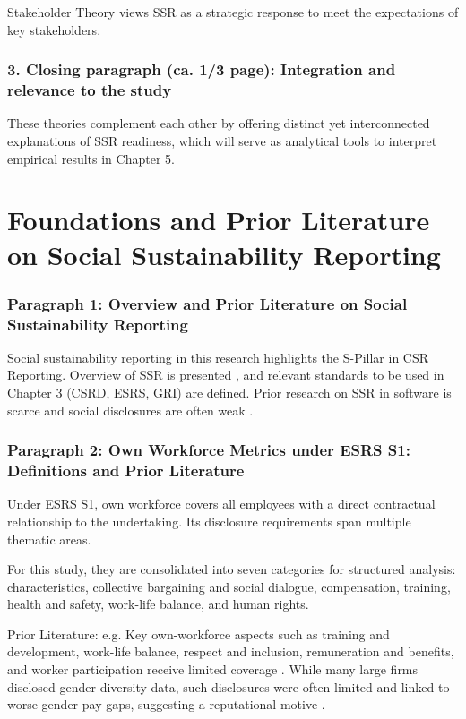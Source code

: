 Stakeholder Theory \parencite{Freeman1984} views SSR as a strategic response to meet the expectations of key stakeholders.

\subsubsection{3. Closing paragraph (ca. 1/3 page): Integration and relevance to the study}

These theories complement each other by offering distinct yet interconnected explanations of SSR readiness, 
which will serve as analytical tools to interpret empirical results in Chapter 5.

\section{Foundations and Prior Literature on Social Sustainability Reporting}

\subsubsection{Paragraph 1: Overview and Prior Literature on Social Sustainability Reporting}
Social sustainability reporting in this research highlights the S-Pillar in CSR Reporting.
Overview of SSR is presented \parencite{Edge2022,Fiechter2022}, and relevant standards \parencite{Dechow2023} to be 
used in Chapter 3 (CSRD, ESRS, GRI) are defined. Prior research on SSR in software is scarce \parencite{Ye2020,Afshari2022} 
and social disclosures are often weak \parencite{Christensen2021,Reitmaier2024}.

\subsubsection{Paragraph 2: Own Workforce Metrics under ESRS S1: Definitions and Prior Literature}
Under ESRS S1, own workforce covers all employees with a direct contractual relationship to the undertaking. 
Its disclosure requirements span multiple thematic areas.

For this study, 
they are consolidated into seven categories for structured analysis: characteristics, 
collective bargaining and social dialogue, compensation, training, health and safety, work-life balance, and human rights.

Prior Literature: e.g. Key own-workforce aspects such as training and development, work-life balance, respect and inclusion, 
remuneration and benefits, and worker participation receive limited coverage \parencite{Greig2021}. While many large firms disclosed gender diversity data, such disclosures were often limited and 
linked to worse gender pay gaps, suggesting a reputational motive \parencite{Huang2022}.

